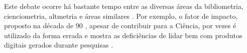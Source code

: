 Este debate ocorre há bastante tempo entre as diversas áreas da bibliometria,
cienciometria, altmetria e áreas similares \cite{gouveia2013altmetria}.
Por exemplo, o fator de impacto, proposto na década de 90
\cite{history_citation_indexing}, apesar de contribuir para a Ciência, por
vezes é utilizado da forma errada e mostra as deficiências de lidar bem com
produtos digitais gerados durante pesquisas \cite{katz2014transitive}.






%


